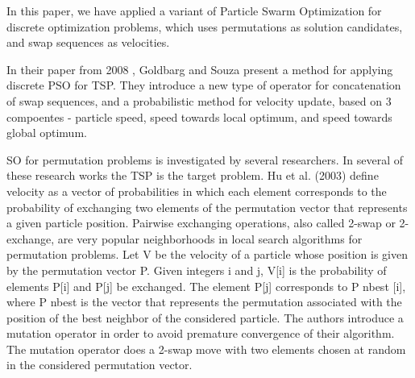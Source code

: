 In this paper, we have applied a variant of Particle Swarm Optimization for discrete optimization problems, which uses permutations as solution candidates, and swap sequences as velocities.

In their paper from 2008 \cite{PSO08tsp}, Goldbarg and Souza present a method for applying discrete PSO for TSP. They introduce a new type of operator for concatenation of swap sequences, and a probabilistic method for velocity update, based on 3 compoentes - particle speed, speed towards local optimum, and speed towards global optimum.

SO for permutation problems is investigated by several researchers. In several of these research works the TSP is the target problem. Hu et al. (2003) define velocity as a vector of probabilities in which each element corresponds to the probability of exchanging two elements of the permutation vector that
represents a given particle position. Pairwise exchanging operations, also called 2-swap or 2-exchange, are very popular neighborhoods in local search algorithms for permutation problems. Let V be the velocity of a particle whose position is given by the permutation vector P. Given integers i and j, V[i] is the probability of elements P[i] and P[j] be exchanged.
The element P[j] corresponds to P nbest [i], where P nbest is the vector that represents the permutation associated with the position of the best neighbor of the considered particle. The authors introduce a mutation operator in order to avoid premature convergence of their algorithm. The mutation operator does a 2-swap move with two elements chosen at random
in the considered permutation vector.
